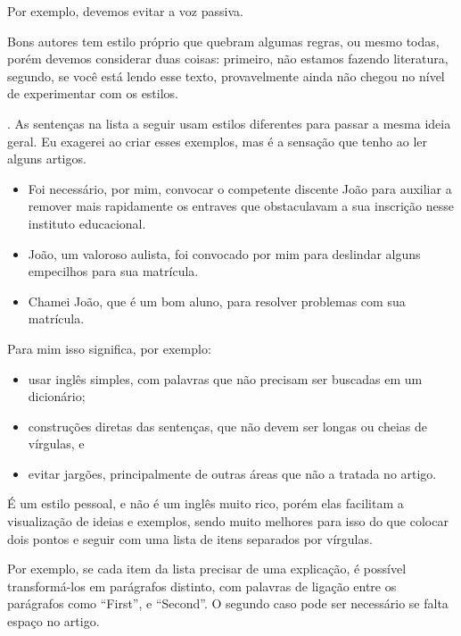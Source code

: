\documentclass[openany]{book}
\begin{document}
 Por exemplo, devemos evitar  a voz passiva.

Bons autores tem estilo próprio que quebram algumas regras, ou mesmo todas, porém devemos considerar duas coisas: primeiro, não estamos fazendo literatura, segundo, se você está lendo esse texto, provavelmente ainda não chegou no nível de experimentar com os estilos.

. As sentenças na lista a seguir usam estilos diferentes para passar a mesma ideia geral. Eu exagerei ao criar esses exemplos, mas é a sensação que tenho ao ler alguns artigos.
\begin{itemize}
    \item Foi necessário, por mim, convocar o competente discente João para auxiliar a remover mais rapidamente os entraves que obstaculavam a sua inscrição nesse instituto educacional.
    \item João, um valoroso aulista, foi convocado por mim para deslindar alguns empecilhos para sua matrícula.
    \item Chamei João, que é um bom aluno, para resolver problemas com sua matrícula.
\end{itemize}



 Para mim isso significa, por exemplo:
\begin{itemize}
    \item usar inglês simples, com palavras que não precisam ser buscadas em um dicionário;
    \item construções diretas das sentenças, que não devem ser longas ou cheias de vírgulas, e
    \item evitar jargões, principalmente de outras áreas que não a tratada no artigo.
\end{itemize}

 É um estilo pessoal, e não é um inglês muito rico, porém elas facilitam a visualização de ideias e exemplos, sendo muito melhores para isso do que colocar dois pontos e seguir com uma lista de itens separados por vírgulas.

   Por exemplo, se cada item da lista precisar de uma explicação, é possível transformá-los em parágrafos distinto, com palavras de ligação entre os parágrafos como ``First'', e ``Second''. O segundo caso pode ser necessário se falta espaço no artigo.
\end{document}
